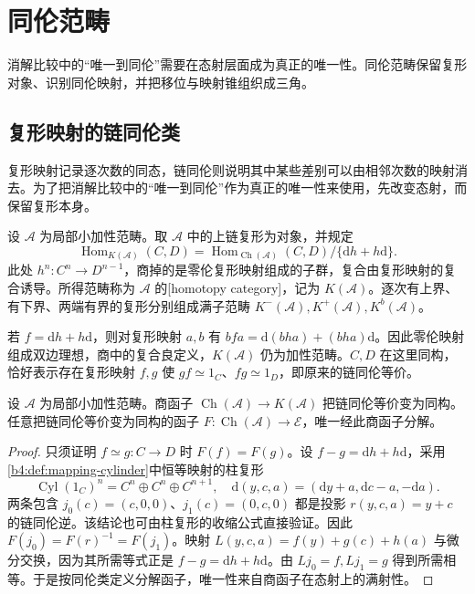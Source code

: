 
\section{同伦范畴}
\label{b4:sec:1601}

消解比较中的“唯一到同伦”需要在态射层面成为真正的唯一性。同伦范畴保留复形对象、识别同伦映射，并把移位与映射锥组织成三角。


%
%

\subsection{复形映射的链同伦类}
\label{b4:subsec:1601:01}

复形映射记录逐次数的同态，链同伦则说明其中某些差别可以由相邻次数的映射消去。为了把消解比较中的“唯一到同伦”作为真正的唯一性来使用，先改变态射，而保留复形本身。

\begin{definition}\label{b4:def:homotopy-category}
设 \(\mathcal A\) 为局部小加性范畴。取 \(\mathcal A\) 中的上链复形为对象，并规定
\[
 \operatorname{Hom}_{K(\mathcal A)}(C,D)
 =\operatorname{Hom}_{\operatorname{Ch}(\mathcal A)}(C,D)/\{\mathrm{d}h+h\mathrm{d}\}.
\]
此处 \(h^n:C^n\to D^{n-1}\)，商掉的是零伦复形映射组成的子群，复合由复形映射的复合诱导。所得范畴称为 \(\mathcal A\) 的[homotopy category]，记为 \(K(\mathcal A)\)。逐次有上界、有下界、两端有界的复形分别组成满子范畴 \(K^-(\mathcal A),K^+(\mathcal A),K^b(\mathcal A)\)。
\end{definition}

若 \(f=\mathrm{d}h+h\mathrm{d}\)，则对复形映射 \(a,b\) 有 \(bfa=\mathrm{d}(bha)+(bha)\mathrm{d}\)。因此零伦映射组成双边理想，商中的复合良定义，\(K(\mathcal A)\) 仍为加性范畴。\(C,D\) 在这里同构，恰好表示存在复形映射 \(f,g\) 使 \(gf\simeq1_C\)、\(fg\simeq1_D\)，即原来的链同伦等价。

\begin{proposition}\label{b4:prop:homotopy-universal}
设 \(\mathcal A\) 为局部小加性范畴。商函子 \(\operatorname{Ch}(\mathcal A)\to K(\mathcal A)\) 把链同伦等价变为同构。任意把链同伦等价变为同构的函子 \(F:\operatorname{Ch}(\mathcal A)\to\mathcal E\)，唯一经此商函子分解。
\end{proposition}
\begin{proof}
只须证明 \(f\simeq g:C\to D\) 时 \(F(f)=F(g)\)。设 \(f-g=\mathrm{d}h+h\mathrm{d}\)，采用\cref{b4:def:mapping-cylinder}中恒等映射的柱复形
\[
 \operatorname{Cyl}(1_C)^n=C^n\oplus C^n\oplus C^{n+1},\quad
 \mathrm{d}(y,c,a)=(\mathrm{d}y+a,\mathrm{d}c-a,-\mathrm{d}a).
\]
两条包含 \(j_0(c)=(c,0,0)\)、\(j_1(c)=(0,c,0)\) 都是投影 \(r(y,c,a)=y+c\) 的链同伦逆。该结论也可由柱复形的收缩公式直接验证。因此 \(F(j_0)=F(r)^{-1}=F(j_1)\)。映射
\(L(y,c,a)=f(y)+g(c)+h(a)\) 与微分交换，因为其所需等式正是 \(f-g=\mathrm{d}h+h\mathrm{d}\)。由 \(Lj_0=f,Lj_1=g\) 得到所需相等。于是按同伦类定义分解函子，唯一性来自商函子在态射上的满射性。
\end{proof}

